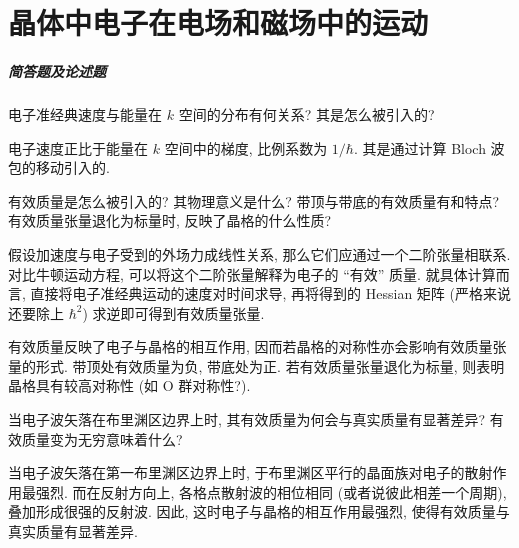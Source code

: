 \documentclass[UTF8]{ctexart}
\newenvironment{Answer}{}{}
\begin{document}
\section{晶体中电子在电场和磁场中的运动}
    \subparagraph{简答题及论述题}
        \begin{Question}
            \item 电子准经典速度与能量在 $k$ 空间的分布有何关系? 其是怎么被引入的?

\begin{Answer}
    \begin{Solve}[Solve:]
        \hspace*{2em}电子速度正比于能量在 $k$ 空间中的梯度, 比例系数为 $1 / \hbar$. 其是通过计算 Bloch 波包的移动引入的.
    \end{Solve}
\end{Answer}

            \item 有效质量是怎么被引入的? 其物理意义是什么? 带顶与带底的有效质量有和特点? 有效质量张量退化为标量时, 反映了晶格的什么性质?

\begin{Answer}
    \begin{Solve}[Solve:]
        \hspace*{2em}假设加速度与电子受到的外场力成线性关系, 那么它们应通过一个二阶张量相联系. 对比牛顿运动方程, 可以将这个二阶张量解释为电子的 ``有效'' 质量. 就具体计算而言, 直接将电子准经典运动的速度对时间求导, 再将得到的 Hessian 矩阵 (严格来说还要除上 $\hbar^2$) 求逆即可得到有效质量张量.

        \hspace*{2em}有效质量反映了电子与晶格的相互作用, 因而若晶格的对称性亦会影响有效质量张量的形式. 带顶处有效质量为负, 带底处为正. 若有效质量张量退化为标量, 则表明晶格具有较高对称性 (如 O 群对称性?).
    \end{Solve}
\end{Answer}

            \item 当电子波矢落在布里渊区边界上时, 其有效质量为何会与真实质量有显著差异? 有效质量变为无穷意味着什么?

\begin{Answer}
    \begin{Solve}[Solve:]
        \hspace*{2em}当电子波矢落在第一布里渊区边界上时, 于布里渊区平行的晶面族对电子的散射作用最强烈. 而在反射方向上, 各格点散射波的相位相同 (或者说彼此相差一个周期), 叠加形成很强的反射波. 因此, 这时电子与晶格的相互作用最强烈, 使得有效质量与真实质量有显著差异.


\end{Solve}
\end{Answer}
\end{Question}
\end{document}
